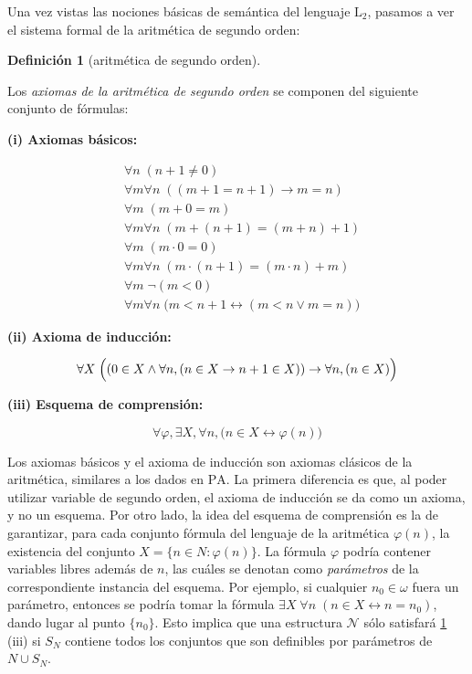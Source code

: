 \documentclass[11pt,a4paper]{book}
\theoremstyle{plain}
\theoremstyle{definition}
\newtheorem{definicion}[teorema]{Definición}
\theoremstyle{remark}
\begin{document}
Una vez vistas las nociones básicas de semántica del lenguaje $\mathrm{L}_2$, pasamos a ver el sistema formal de la aritmética de segundo orden:

\begin{definicion}[aritmética de segundo orden]
\label{axiomas-Z2}

  Los \textit{axiomas de la aritmética de segundo orden} se componen del siguiente conjunto de fórmulas:

  \textbf{(i) Axiomas básicos:}

  \begin{align*}
  &\forall n \; (n + 1 \neq 0) \\
  &\forall m \forall n \; ((m + 1 = n + 1) \to m = n) \\
  &\forall m \; (m + 0 = m) \\
  &\forall m \forall n \; (m + (n + 1) = (m + n) + 1) \\
  &\forall m \; (m \cdot 0 = 0) \\
  &\forall m \forall n \; (m \cdot (n + 1) = (m \cdot n) + m) \\
  &\forall m \; \neg (m < 0) \\
  &\forall m \forall n \; \bigl(m < n + 1 \leftrightarrow (m < n \lor m = n)\bigr)
  \end{align*}

  \textbf{(ii) Axioma de inducción:}

  \[
  \forall X \; \Bigl( (0 \in X \land \forall n , (n \in X \to n + 1 \in X)) \to \forall n , (n \in X) \Bigr)
  \]

  \textbf{(iii) Esquema de comprensión:}

  \[
  \forall \varphi , \exists X , \forall n , \bigl(n \in X \leftrightarrow \varphi(n)\bigr)
  \]



\end{definicion}

Los axiomas básicos y el axioma de inducción son axiomas clásicos de la aritmética, similares a los dados en $\mathrm{PA}$. La primera diferencia es que, al poder utilizar variable de segundo orden, el axioma de inducción se da como un axioma, y no un esquema. Por otro lado, la idea del esquema de comprensión es la de garantizar, para cada conjunto fórmula del lenguaje de la aritmética $\varphi(n)$, la existencia del conjunto $X = \{ n \in N : \varphi(n) \}$. La fórmula $\varphi$ podría contener variables libres además de $n$, las cuáles se denotan como \textit{parámetros} de la correspondiente instancia del esquema. Por ejemplo, si cualquier $n_0 \in \omega$ fuera un parámetro, entonces se podría tomar la fórmula $\exists X \; \forall n \; (n \in X \leftrightarrow n = n_0)$, dando lugar al punto $\{ n_0 \}$. Esto implica que una estructura $\mathcal{N}$ sólo satisfará \ref{axiomas-Z2} (iii) si $S_N$ contiene todos los conjuntos que son definibles por parámetros de $N \cup S_N$. 
\end{document}
